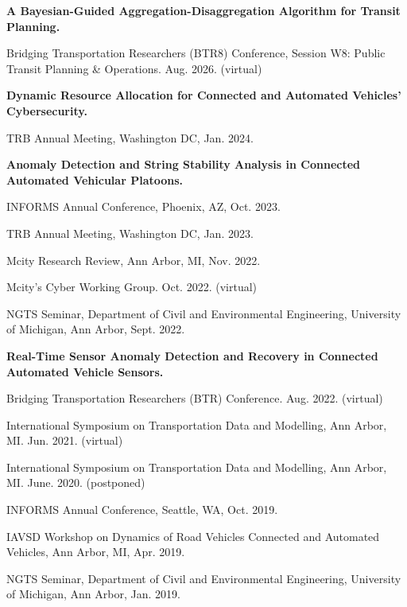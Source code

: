 \documentclass[]{Keval-resume}
\begin{document}
\textbf{A Bayesian-Guided Aggregation-Disaggregation Algorithm for Transit Planning.}
\begin{cvitems}
    \item
    {Bridging Transportation Researchers (BTR8) Conference, Session W8: Public Transit Planning \& Operations. Aug. 2026. (virtual)}
\end{cvitems}
\sectionsep
\textbf{Dynamic Resource Allocation for Connected and Automated Vehicles' Cybersecurity.}
\begin{cvitems}
    \item 
    {TRB Annual Meeting, Washington DC, Jan. 2024.}
\end{cvitems}
\sectionsep
\textbf{Anomaly Detection and String Stability Analysis in Connected Automated Vehicular Platoons.}
\begin{cvitems}
    \item 
    {INFORMS Annual Conference, Phoenix, AZ, Oct. 2023.}
    \item 
    {TRB Annual Meeting, Washington DC, Jan. 2023.}
    \item
    {Mcity Research Review, Ann Arbor, MI, Nov. 2022.}
    \item 
    {Mcity's Cyber Working Group. Oct. 2022. (virtual)}
    \item
    {NGTS Seminar, Department of Civil and Environmental Engineering, University of Michigan, Ann Arbor, Sept. 2022.}
\end{cvitems}
\sectionsep
\textbf{Real-Time Sensor Anomaly Detection and Recovery in Connected Automated Vehicle Sensors.}
\begin{cvitems}
    \item 
    {Bridging Transportation Researchers (BTR) Conference. Aug. 2022. (virtual)}
    \item 
    {International Symposium on Transportation Data and Modelling, Ann Arbor, MI. Jun. 2021. (virtual)}
    \item 
    {International Symposium on Transportation Data and Modelling, Ann Arbor, MI. June. 2020. (postponed)}
    \item 
    {INFORMS Annual Conference, Seattle, WA, Oct. 2019.}
    \item 
    {IAVSD Workshop on Dynamics of Road Vehicles Connected and Automated Vehicles, Ann Arbor, MI, Apr. 2019.}
    \item 
    {NGTS Seminar, Department of Civil and Environmental Engineering, University of Michigan, Ann Arbor, Jan. 2019.}
\end{cvitems}
\end{document}
